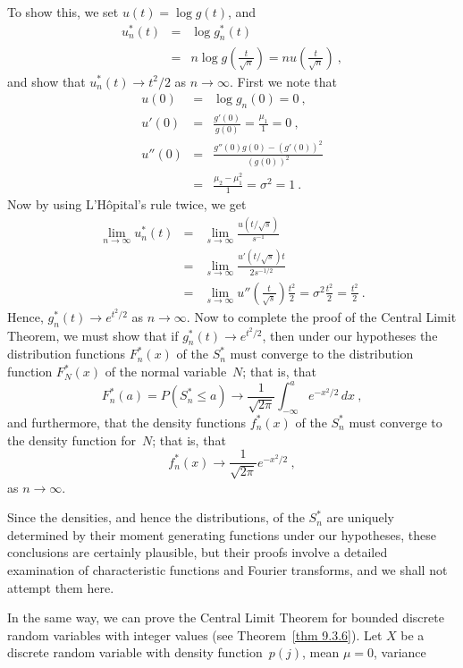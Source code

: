 To show this, we set $u(t) = \log g(t)$, and
\begin{eqnarray*}
u_n^*(t) &=& \log g_n^*(t) \\
         &=& n\log g\left(\frac t{\sqrt n}\right) = nu\left(\frac t{\sqrt n}\right)\ ,
\end{eqnarray*}
and show that $u_n^*(t) \to t^2/2$ as $n \to \infty$.  First we note that
\begin{eqnarray*} 
  u(0) &=& \log g_n(0) = 0\ , \\
 u'(0) &=& \frac{g'(0)}{g(0)} = \frac{\mu_1}1 = 0\ , \\
u''(0) &=& \frac{g''(0)g(0) - (g'(0))^2}{(g(0))^2} \\
       &=& \frac{\mu_2 - \mu_1^2}1 = \sigma^2 = 1\ .
\end{eqnarray*}
Now by using L'H\^opital's rule twice, we get
\begin{eqnarray*}
\lim_{n \to \infty} u_n^*(t) &=& \lim_{s \to \infty} \frac{u(t/\sqrt s)}{s^{-1}}\\
     &=& \lim_{s \to \infty} \frac{u'(t/\sqrt s) t}{2s^{-1/2}} \\
     &=& \lim_{s \to \infty} u''\left(\frac t{\sqrt s}\right) \frac{t^2}2 = \sigma^2
\frac{t^2}2 = \frac{t^2}2\ .
\end{eqnarray*}
Hence, $g_n^*(t) \to e^{t^2/2}$ as $n \to \infty$.  Now to complete the proof
of the Central Limit Theorem, we must show that if $g_n^*(t) \to e^{t^2/2}$,
then under our hypotheses the distribution functions $F_n^*(x)$ of the $S_n^*$
must converge to the distribution function $F_N^*(x)$ of the normal
variable~$N$; that is, that
$$
F_n^*(a) = P(S_n^* \leq a) \to \frac1{\sqrt{2\pi}} \int_{-\infty}^a
e^{-x^2/2}\, dx\ ,
$$
and furthermore, that the density functions $f_n^*(x)$ of the $S_n^*$ must
converge to the density function for~$N$; that is, that
$$
f_n^*(x) \to \frac1{\sqrt{2\pi}} e^{-x^2/2}\ ,
$$
as $n \rightarrow \infty$.
\par
Since the densities, and hence the distributions, of the $S_n^*$ are uniquely 
determined by their moment generating functions under our hypotheses, these
conclusions are certainly plausible, but their proofs involve a detailed
examination of characteristic functions and Fourier transforms, and we shall
not attempt them here.
\par
In the same way, we can prove the Central Limit Theorem for bounded discrete
random variables with integer values (see Theorem~\ref{thm 9.3.6}).  Let $X$ be a
discrete random variable with density function~$p(j)$, mean $\mu = 0$, variance

